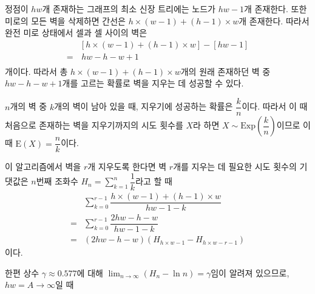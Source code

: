 정점이 $hw$개 존재하는 그래프의 최소 신장 트리에는 노드가 $hw-1$개 존재한다. 또한 미로의 모든 벽을 삭제하면 간선은
$h \times \left(w - 1\right) + \left(h - 1\right) \times w$개 존재한다. 따라서 완전 미로 상태에서 셀과 셀 사이의
벽은
\begin{align*}
    & \left[h \times \left(w - 1\right) + \left(h - 1\right) \times w\right] - \left[hw-1\right] \\
    =&\, hw - h - w + 1 \\
\end{align*}
개이다. 따라서 총 $h \times \left(w - 1\right) + \left(h - 1\right) \times w$개의 원래 존재하던 벽 중 $hw - h - w + 1$개를
고르는 확률로 벽을 지우는 데 성공할 수 있다.

$n$개의 벽 중 $k$개의 벽이 남아 있을 때, 지우기에 성공하는 확률은 $\dfrac{k}{n}$이다. 따라서 이 때 처음으로 존재하는 벽을 지우기까지의 시도 횟수를
$X$라 하면 $X \sim \mathrm{Exp}\left(\dfrac{k}{n}\right)$이므로 이 때 $\mathrm{E}\left(X\right) = \dfrac{n}{k}$이다.

이 알고리즘에서 벽을 $r$개 지우도록 한다면 벽 $r$개를 지우는 데 필요한 시도 횟수의 기댓값은
$n$번째 조화수 $\displaystyle H_n = \sum_{k=1}^n \dfrac{1}{k}$라고 할 때
\begin{align*}
    & \sum_{k=0}^{r-1} \dfrac{h \times \left(w - 1\right) + \left(h - 1\right) \times w}{hw - 1 - k} \\
    =& \sum_{k=0}^{r-1} \dfrac{2hw - h - w}{hw - 1 - k} \\
    =& \left(2hw - h - w\right) \left(H_{h\times w - 1} - H_{h\times w - r - 1}\right)
\end{align*}
이다.

한편 상수 $\gamma \approx 0.577$에 대해 $\displaystyle \lim_{n \rightarrow \infty} \left(H_n - \ln n\right) = \gamma$임이 알려져 있으므로,
$hw = A \rightarrow \infty$일 때

